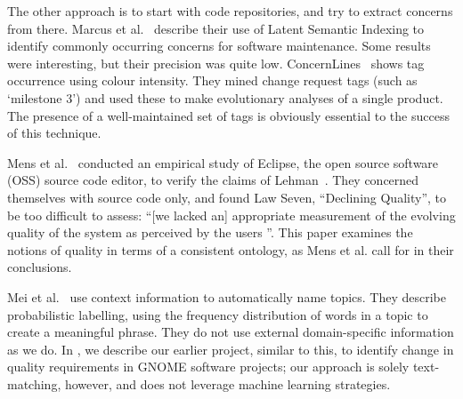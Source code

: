 \documentclass{acm_proc_article-sp}
\begin{document}
The other approach is to start with code repositories, and try to extract concerns from there. Marcus et al.~\cite{marcus04wcre} describe their use of Latent Semantic Indexing to identify commonly occurring concerns for software maintenance. Some results were interesting, but their precision was quite low. ConcernLines~\cite{treude09cl} shows tag occurrence using colour intensity. They mined change request tags (such as `milestone 3') and used these to make evolutionary analyses of a single product. The presence of a well-maintained set of tags is obviously essential to the success of this technique.

Mens et al.~\cite{mens08icsm} conducted an empirical study of Eclipse, the open source software (OSS) source code editor, to verify the claims of Lehman~\cite{lehman97sms}. They concerned themselves with source code only, and found Law Seven, ``Declining Quality'', to be too difficult to assess: ``[we lacked an] appropriate measurement of the evolving quality of the system as perceived by the users \cite[p. 388]{mens08icsm}''. This paper examines the notions of quality in terms of a consistent ontology, as Mens et al. call for in their conclusions.

Mei et al.~\cite{Mei2007} use context information to automatically name topics. They describe probabilistic labelling, using the frequency distribution of words in a topic to create a meaningful phrase. They do not use external domain-specific information as we do.
In \cite{ernst10refsq}, we describe our earlier project, similar to this, to identify change in quality requirements in GNOME software projects; our approach is solely text-matching, however, and does not leverage machine learning strategies.
\end{document}
